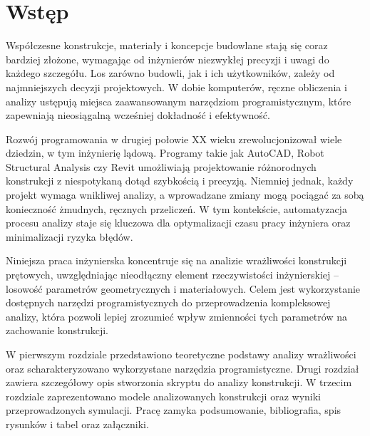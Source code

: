 \section*{Wstęp}

Współczesne konstrukcje, materiały i koncepcje budowlane stają się coraz bardziej złożone, wymagając od inżynierów niezwykłej precyzji i uwagi do każdego szczegółu.
Los zarówno budowli, jak i ich użytkowników, zależy od najmniejszych decyzji projektowych.
W dobie komputerów, ręczne obliczenia i analizy ustępują miejsca zaawansowanym narzędziom programistycznym, które zapewniają nieosiągalną wcześniej dokładność i efektywność.

Rozwój programowania w drugiej połowie XX wieku zrewolucjonizował wiele dziedzin, w tym inżynierię lądową.
Programy takie jak AutoCAD, Robot Structural Analysis czy Revit umożliwiają projektowanie różnorodnych konstrukcji z niespotykaną dotąd szybkością i precyzją.
Niemniej jednak, każdy projekt wymaga wnikliwej analizy, a wprowadzane zmiany mogą pociągać za sobą konieczność żmudnych, ręcznych przeliczeń.
W tym kontekście, automatyzacja procesu analizy staje się kluczowa dla optymalizacji czasu pracy inżyniera oraz minimalizacji ryzyka błędów.

Niniejsza praca inżynierska koncentruje się na analizie wrażliwości konstrukcji prętowych, uwzględniając nieodłączny element rzeczywistości inżynierskiej – losowość parametrów geometrycznych i materiałowych.
Celem jest wykorzystanie dostępnych narzędzi programistycznych do przeprowadzenia kompleksowej analizy, która pozwoli lepiej zrozumieć wpływ zmienności tych parametrów na zachowanie konstrukcji.

W pierwszym rozdziale przedstawiono teoretyczne podstawy analizy wrażliwości oraz scharakteryzowano wykorzystane narzędzia programistyczne.
Drugi rozdział zawiera szczegółowy opis stworzonia skryptu do analizy konstrukcji.
W trzecim rozdziale zaprezentowano modele analizowanych konstrukcji oraz wyniki przeprowadzonych symulacji.
Pracę zamyka podsumowanie, bibliografia, spis rysunków i tabel oraz załączniki.
